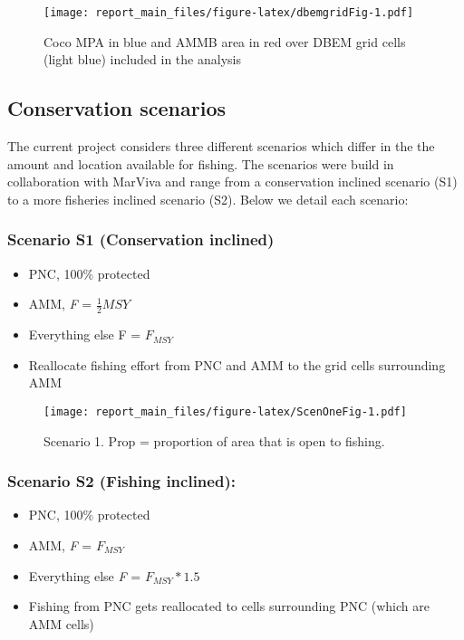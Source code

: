 \documentclass[
]{article}
\providecommand{\tightlist}{%
  \setlength{\itemsep}{0pt}\setlength{\parskip}{0pt}}
\begin{document}
\begin{figure}
\centering
\texttt{[image: report\_main\_files/figure-latex/dbemgridFig-1.pdf]}
\caption{\label{fig:dbemgridFig}Coco MPA in blue and AMMB area in red over DBEM grid cells (light blue) included in the analysis}
\end{figure}

\hypertarget{conservation-scenarios}{%
\subsection{Conservation scenarios}\label{conservation-scenarios}}

The current project considers three different scenarios which differ in the the amount and location available for fishing. The scenarios were build in collaboration with MarViva and range from a conservation inclined scenario (S1) to a more fisheries inclined scenario (S2). Below we detail each scenario:

\hypertarget{scenario-s1-conservation-inclined}{%
\subsubsection{Scenario S1 (Conservation inclined)}\label{scenario-s1-conservation-inclined}}

\begin{itemize}
\tightlist
\item
  PNC, 100\% protected
\item
  AMM, \emph{F} = \(\frac{1}{2}MSY\)
\item
  Everything else F = \(F_{MSY}\)
\item
  Reallocate fishing effort from PNC and AMM to the grid cells surrounding AMM
\end{itemize}

\begin{figure}
\centering
\texttt{[image: report\_main\_files/figure-latex/ScenOneFig-1.pdf]}
\caption{\label{fig:ScenOneFig}Scenario 1. Prop = proportion of area that is open to fishing.}
\end{figure}

\hypertarget{scenario-s2-fishing-inclined}{%
\subsubsection{Scenario S2 (Fishing inclined):}\label{scenario-s2-fishing-inclined}}

\begin{itemize}
\tightlist
\item
  PNC, 100\% protected
\item
  AMM, \emph{F} = \(F_{MSY}\)
\item
  Everything else \emph{F} = \(F_{MSY}*1.5\)
\item
  Fishing from PNC gets reallocated to cells surrounding PNC (which are AMM cells)
\end{itemize}
\end{document}
